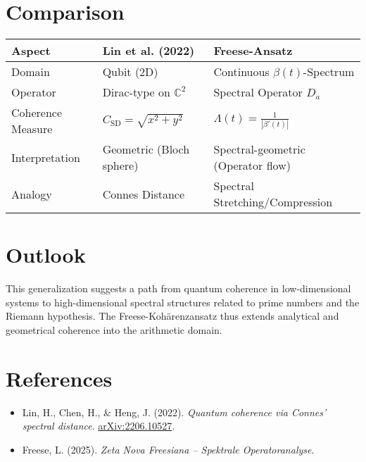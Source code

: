 \documentclass[11pt]{article}
\begin{document}
\section{Comparison}
\begin{tabular}{|l|l|l|}
\hline
\textbf{Aspect} & \textbf{Lin et al. (2022)} & \textbf{Freese-Ansatz} \\
\hline
Domain & Qubit (2D) & Continuous $\beta(t)$-Spectrum \\
Operator & Dirac-type on $\mathbb{C}^2$ & Spectral Operator $D_a$ \\
Coherence Measure & $C_{\text{SD}} = \sqrt{x^2 + y^2}$ & $\Lambda(t) = \frac{1}{|\beta'(t)|}$ \\
Interpretation & Geometric (Bloch sphere) & Spectral-geometric (Operator flow) \\
Analogy & Connes Distance & Spectral Stretching/Compression \\
\hline
\end{tabular}

\section{Outlook}
This generalization suggests a path from quantum coherence in low-dimensional systems to high-dimensional spectral structures related to prime numbers and the Riemann hypothesis. The Freese-Kohärenzansatz thus extends analytical and geometrical coherence into the arithmetic domain.

\section*{References}
\begin{itemize}
  \item Lin, H., Chen, H., \& Heng, J. (2022). \textit{Quantum coherence via Connes’ spectral distance}. \href{https://arxiv.org/abs/2206.10527}{arXiv:2206.10527}.
  \item Freese, L. (2025). \textit{Zeta Nova Freesiana – Spektrale Operatoranalyse}.
\end{itemize}
\end{document}
